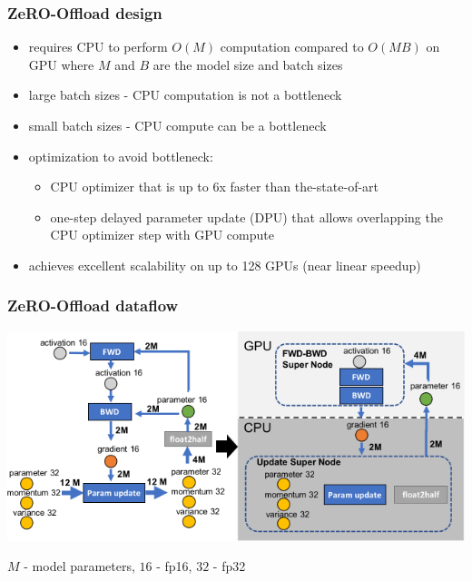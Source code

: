 \documentclass{beamer}
\begin{document}
\begin{frame}
    \frametitle{ZeRO-Offload design}
    \begin{itemize}
        \item requires CPU to perform $O(M)$ computation compared to $O(MB)$ on GPU where $M$ and $B$ are the model size and batch sizes
        \item large batch sizes - CPU computation is not a bottleneck
        \item small batch sizes - CPU compute can be a bottleneck
        \item optimization to avoid bottleneck:
        \begin{itemize}
            \item CPU optimizer that is up to 6x faster than the-state-of-art
            \item one-step delayed parameter update (DPU) that allows overlapping the CPU optimizer step with GPU compute
        \end{itemize}
        \item achieves excellent scalability on up to 128 GPUs (near linear speedup)
    \end{itemize}
\end{frame}

\begin{frame}
    \frametitle{ZeRO-Offload dataflow}
    \begin{center}
        \includegraphics[scale=2.0]{img/zero_offload_dataflow.png}
    \end{center}
    \tiny{$M$ - model parameters, $16$ - fp16, $32$ - fp32}
\end{frame}
\end{document}
